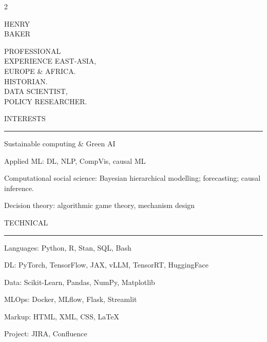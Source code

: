 \documentclass[a4paper,10pt]{article}
\newcommand{\sidebarsection}[1]{%
    \vspace{1em}%
    {\montserratbold\fontsize{11}{13}\selectfont\MakeUppercase{#1}}\\[-0.2em]%
    {\color{rule}\rule{1.5cm}{2pt}}%
    \vspace{0.5em}\par%
}
\newcommand{\skillcat}[2]{%
    {\montserratsemibold #1:} {#2}%
}
\newcommand{\sidebartext}[1]{%
    {\fontsize{9}{12}\selectfont #1}%
}
\begin{document}
\begin{paracol}{2}


\vspace*{-0.3em}
{\montserratblack\fontsize{30}{34}\selectfont HENRY}\\[0.1em]
{\montserratblack\fontsize{30}{34}\selectfont BAKER}

\vspace{0.9em}

{\fontsize{7.5}{10}\selectfont\color{medgrey}%
PROFESSIONAL\\
EXPERIENCE EAST-ASIA,\\
EUROPE \& AFRICA.\\
HISTORIAN.\\
DATA SCIENTIST,\\
POLICY RESEARCHER.}

\sidebarsection{Interests}

\sidebartext{%
{\montserratsemibold Sustainable computing} \& Green AI\par\vspace{0.25em}
{\montserratsemibold Applied ML:} DL, NLP, CompVis, causal ML\par\vspace{0.25em}
{\montserratsemibold Computational social science:} Bayesian hierarchical modelling; forecasting; causal inference.\par\vspace{0.25em}
{\montserratsemibold Decision theory:} algorithmic game theory, mechanism design%
}

\sidebarsection{Technical}

\sidebartext{%
\skillcat{Languages}{Python, R, Stan, SQL, Bash}\par\vspace{0.2em}
\skillcat{DL}{PyTorch, TensorFlow, JAX, vLLM, TensorRT, HuggingFace}\par\vspace{0.2em}
\skillcat{Data}{Scikit-Learn, Pandas, NumPy, Matplotlib}\par\vspace{0.2em}
\skillcat{MLOps}{Docker, MLflow, Flask, Streamlit}\par\vspace{0.2em}
\skillcat{Markup}{HTML, XML, CSS, \LaTeX}\par\vspace{0.2em}
\skillcat{Project}{JIRA, Confluence}%
}


\end{paracol}
\end{document}
